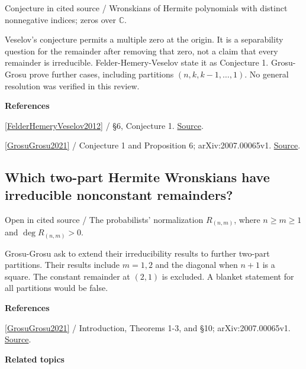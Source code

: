 \documentclass[11pt,a4paper,oneside,openany]{book}
\newenvironment{sources}{\par\smallskip\begingroup\footnotesize\color{atlasgray}\leftskip=10pt\setlength{\parskip}{2pt}}{\par\endgroup\smallskip}
\begin{document}
{\small\sffamily\color{atlasgold}Conjecture in cited source / Wronskians of Hermite polynomials with distinct nonnegative indices; zeros over \(\mathbb C\).}\par\smallskip
\color{black} Veselov's conjecture permits a multiple zero at the origin. It is a separability question for the remainder after removing that zero, not a claim that every remainder is irreducible. Felder-Hemery-Veselov state it as Conjecture 1. Grosu-Grosu prove further cases, including partitions \((n,k,k-1,\ldots,1)\). No general resolution was verified in this review.\par
\begin{sources}
\textbf{References}\par\smallskip
\noindent\hyperlink{ref:FelderHemeryVeselov2012}{[FelderHemeryVeselov2012]} / §6, Conjecture 1.  \href{https://doi.org/10.1016/j.physd.2012.08.008}{Source}.\par
\noindent\hyperlink{ref:GrosuGrosu2021}{[GrosuGrosu2021]} / Conjecture 1 and Proposition 6; arXiv:2007.00065v1.  \href{https://doi.org/10.1016/j.indag.2020.12.004}{Source}.\par
\end{sources}\color{black}
\subsection*{Which two-part Hermite Wronskians have irreducible nonconstant remainders?}
{\small\sffamily\color{atlasgold}Open in cited source / The probabilists' normalization \(R_{(n,m)}\), where \(n\ge m\ge1\) and \(\deg R_{(n,m)}>0\).}\par\smallskip
\color{black} Grosu-Grosu ask to extend their irreducibility results to further two-part partitions. Their results include \(m=1,2\) and the diagonal when \(n+1\) is a square. The constant remainder at \((2,1)\) is excluded. A blanket statement for all partitions would be false.\par
\begin{sources}
\textbf{References}\par\smallskip
\noindent\hyperlink{ref:GrosuGrosu2021}{[GrosuGrosu2021]} / Introduction, Theorems 1-3, and §10; arXiv:2007.00065v1.  \href{https://doi.org/10.1016/j.indag.2020.12.004}{Source}.\par
\end{sources}\color{black}
\par\medskip\begingroup\footnotesize\setlength{\parskip}{1pt}\textbf{\sffamily\color{atlasgreen}Related topics}\par
\end{document}
